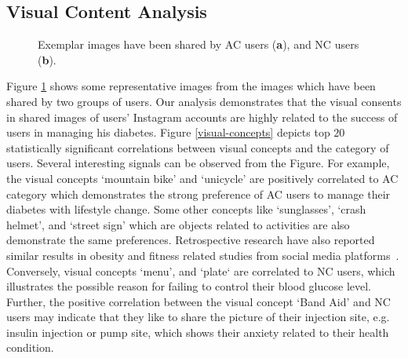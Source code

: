 \documentclass{acm_proc_article-sp}
\begin{document}
\subsection{Visual Content Analysis}
\begin{figure}
 \centering
     \hspace{-1em}
   \vspace{-0.9em}
   \caption{Exemplar images have been shared by AC users (\textbf{a}), and NC users (\textbf{b}).}
\label{fig::visual-samples} %
 \vspace{-1em}
\end{figure}

Figure \ref{fig::visual-samples} shows some representative images from the images which have been shared by two groups of users. Our analysis demonstrates that the visual consents in shared images of users' Instagram accounts are highly related to the success of users in managing his diabetes. Figure \ref{visual-concepts} depicts top $20$ statistically significant correlations between visual concepts and the category of users. Several interesting signals can be observed from the Figure. For example, the visual concepts `mountain bike' and `unicycle' are positively correlated to AC category which demonstrates the strong preference of AC users to manage their diabetes with lifestyle change. Some other concepts like `sunglasses', `crash helmet', and `street sign' which are objects related to activities are also demonstrate the same preferences. Retrospective research have also reported similar results in obesity and fitness related studies from social media platforms~\cite{}. Conversely, visual concepts `menu', and `plate` are correlated to NC users, which illustrates the possible reason for failing to control their blood glucose level. Further, the positive correlation between the visual concept `Band Aid' and NC users may indicate that they like to share the picture of their injection site, e.g. insulin injection or pump site, which shows their anxiety related to their health condition.
\end{document}
